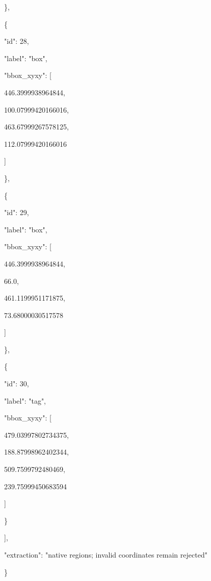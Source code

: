 \documentclass[10pt,a4paper]{article}
\begin{document}
    \},\allowbreak{}\par
    \{\par
      "id":\allowbreak{} 28,\allowbreak{}\par
      "label":\allowbreak{} "box",\allowbreak{}\par
      "bbox\_xyxy":\allowbreak{} [\par
        446.3999938964844,\allowbreak{}\par
        100.07999420166016,\allowbreak{}\par
        463.67999267578125,\allowbreak{}\par
        112.07999420166016\par
      ]\par
    \},\allowbreak{}\par
    \{\par
      "id":\allowbreak{} 29,\allowbreak{}\par
      "label":\allowbreak{} "box",\allowbreak{}\par
      "bbox\_xyxy":\allowbreak{} [\par
        446.3999938964844,\allowbreak{}\par
        66.0,\allowbreak{}\par
        461.1199951171875,\allowbreak{}\par
        73.68000030517578\par
      ]\par
    \},\allowbreak{}\par
    \{\par
      "id":\allowbreak{} 30,\allowbreak{}\par
      "label":\allowbreak{} "tag",\allowbreak{}\par
      "bbox\_xyxy":\allowbreak{} [\par
        479.03997802734375,\allowbreak{}\par
        188.87998962402344,\allowbreak{}\par
        509.7599792480469,\allowbreak{}\par
        239.75999450683594\par
      ]\par
    \}\par
  ],\allowbreak{}\par
  "extraction":\allowbreak{} "native regions; invalid coordinates remain rejected"\par
\}
\end{document}
